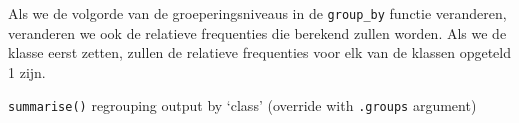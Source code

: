 \documentclass[]{tufte-book}
\newenvironment{Shaded}{}{}
\newcommand{\DataTypeTok}[1]{\textcolor[rgb]{0.56,0.13,0.00}{#1}}
\newcommand{\KeywordTok}[1]{\textcolor[rgb]{0.00,0.44,0.13}{\textbf{#1}}}
\newcommand{\NormalTok}[1]{#1}
\newcommand{\OperatorTok}[1]{\textcolor[rgb]{0.40,0.40,0.40}{#1}}
\newcommand{\StringTok}[1]{\textcolor[rgb]{0.25,0.44,0.63}{#1}}
\begin{document}
Als we de volgorde van de groeperingsniveaus in de \texttt{group\_by} functie veranderen, veranderen we ook de relatieve frequenties die berekend zullen worden. Als we de klasse eerst zetten, zullen de relatieve frequenties voor elk van de klassen opgeteld 1 zijn.

\begin{Shaded}
\end{Shaded}

\texttt{summarise()} regrouping output by `class' (override with \texttt{.groups} argument)
\end{document}
